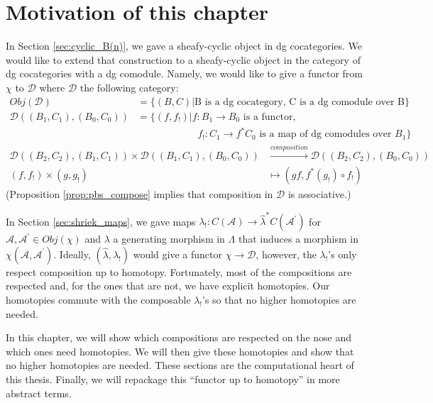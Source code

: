 \section{Motivation of this chapter}
In Section \ref{sec:cyclic_B(n)}, we gave a 
sheafy-cyclic object in dg cocategories. 
We would like to extend that construction 
to a sheafy-cyclic object in the 
category of dg cocategories with a dg 
comodule. Namely, we would like to give 
a functor from $\chi$ to $\mathcal{D}$ 
where $\mathcal{D}$ the following 
category:
\begin{align*}
Obj(\mathcal{D}) 
&= 
\{(B,C) |
  \textrm{B is a dg cocategory, 
  C is a dg comodule over B}\} \\
\mathcal{D}((B_1, C_1), (B_0, C_0))  
&= 
\{(f, f_!) | f:B_1 \to B_0 
  \textrm{ is a functor,}\\
& \phantom{{}=[(f, f_!)]{}}  
  f_!:C_1 \to f^*C_0 
  \textrm{ is a map of dg comodules over }
  B_1\}
\end{align*}
\begin{align*}  
\mathcal{D}((B_2, C_2), (B_1, C_1)) \times  
\mathcal{D}((B_1, C_1), (B_0, C_0))
&\xrightarrow{composition}
\mathcal{D}((B_2, C_2), (B_0, C_0))\\
(f,f_!) \times (g, g_!)
&\mapsto
(gf, f^*(g_!)\circ f_!)
\end{align*}
(Proposition \ref{prop:pbs_compose} implies 
that composition in $\mathcal{D}$ is 
associative.)

In Section \ref{sec:shriek_maps}, we 
gave maps $\lambda_!: C(\mathcal{A}) 
\to \hat{\lambda}^*C(\mathcal{A}^\prime)$ 
for $\mathcal{A}, \mathcal{A}^\prime \in 
Obj(\chi)$ and $\lambda$ a generating 
morphism in $\Lambda$ that induces a 
morphism in $\chi(\mathcal{A}, 
\mathcal{A}^\prime)$. Ideally,  
$(\hat{\lambda}, \lambda_!)$ would give a functor 
$\chi \to \mathcal{D}$, however, 
the $\lambda_!$'s only respect 
composition up to homotopy. Fortunately, 
most of the compositions are respected 
and, for the ones that are not, we 
have explicit homotopies. Our homotopies 
commute with the composable 
$\lambda_!$'s so that no higher homotopies 
are needed.

In this chapter, we will show which compositions 
are respected on the nose and which ones 
need homotopies. We will then give these homotopies 
and show that no higher homotopies are 
needed. These sections are the computational 
heart of this thesis. Finally, we will 
repackage this ``functor up to homotopy'' 
in more abstract terms.